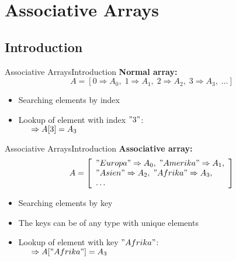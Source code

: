 \section{Associative Arrays}

\subsection{Introduction}

\begin{frame}{Associative Arrays}{Introduction}
  \textbf{Normal array:}\\
  \begin{displaymath}
    A = [0 \Rightarrow A_0, \; 1 \Rightarrow A_1, \;
      2 \Rightarrow A_2, \; 3 \Rightarrow A_3, \; \dotsc]
  \end{displaymath}
  \begin{itemize}
    \item
      Searching elements by {\color{Mittel-Blau}index}\\
    \item
      Lookup of element with index $"3"$:\\
      $\hspace{1.5em}\Rightarrow A[3] = A_3$
  \end{itemize}
\end{frame}


\begin{frame}{Associative Arrays}{Introduction}
  \textbf{Associative array:}\\
  \begin{displaymath}
    A = \left[\begin{array}{l}
      "Europa" \Rightarrow A_0, \; "Amerika" \Rightarrow A_1,\\
      "Asien" \Rightarrow A_2, \; "Afrika" \Rightarrow A_3,\\
      \dotsc
    \end{array}\right]
  \end{displaymath}
  \begin{itemize}
    \item
      Searching elements by {\color{Mittel-Blau}key}\\
    \item
      The keys can be of any type with unique elements
    \item
      Lookup of element with key $"Afrika"$:\\
      $\hspace{1.5em}\Rightarrow A["Afrika"] = A_3$
  \end{itemize}
\end{frame}

